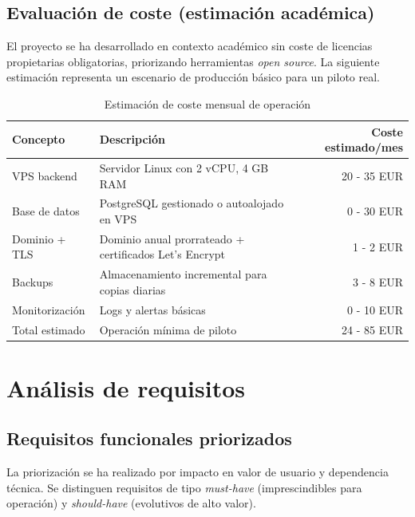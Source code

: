 \documentclass[12pt, a4paper]{report}
\begin{document}
\section{Evaluación de coste (estimación académica)}

El proyecto se ha desarrollado en contexto académico sin coste de licencias propietarias obligatorias,
priorizando herramientas \emph{open source}. La siguiente estimación representa un escenario de
producción básico para un piloto real.

\begin{table}[H]
  \centering
  \caption{Estimación de coste mensual de operación}
  \begin{tabularx}{\textwidth}{lXr}
    \toprule
    \textbf{Concepto} & \textbf{Descripción} & \textbf{Coste estimado/mes} \\
    \midrule
    VPS backend & Servidor Linux con 2 vCPU, 4 GB RAM & 20 - 35 EUR \\
    \addlinespace
    Base de datos & PostgreSQL gestionado o autoalojado en VPS & 0 - 30 EUR \\
    \addlinespace
    Dominio + TLS & Dominio anual prorrateado + certificados Let's Encrypt & 1 - 2 EUR \\
    \addlinespace
    Backups & Almacenamiento incremental para copias diarias & 3 - 8 EUR \\
    \addlinespace
    Monitorización & Logs y alertas básicas & 0 - 10 EUR \\
    \midrule
    Total estimado & Operación mínima de piloto & 24 - 85 EUR \\
    \bottomrule
  \end{tabularx}
\end{table}

\chapter{Análisis de requisitos}

\section{Requisitos funcionales priorizados}

La priorización se ha realizado por impacto en valor de usuario y dependencia técnica. Se distinguen
requisitos de tipo \emph{must-have} (imprescindibles para operación) y \emph{should-have}
(evolutivos de alto valor).
\end{document}
